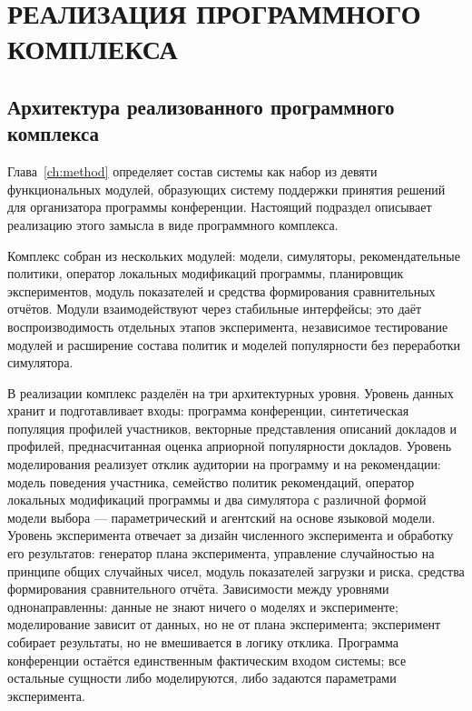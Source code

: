 \chapter{РЕАЛИЗАЦИЯ ПРОГРАММНОГО КОМПЛЕКСА}
\label{ch:implementation}
\sloppy


\section{Архитектура реализованного программного комплекса}
\label{sec:3-1}

Глава~\ref{ch:method} определяет состав системы как набор из девяти функциональных модулей, образующих систему поддержки принятия решений для организатора программы конференции. Настоящий подраздел описывает реализацию этого замысла в виде программного комплекса.

Комплекс собран из нескольких модулей: модели, симуляторы, рекомендательные политики, оператор локальных модификаций программы, планировщик экспериментов, модуль показателей и средства формирования сравнительных отчётов. Модули взаимодействуют через стабильные интерфейсы; это даёт воспроизводимость отдельных этапов эксперимента, независимое тестирование модулей и расширение состава политик и моделей популярности без переработки симулятора.

В реализации комплекс разделён на три архитектурных уровня. Уровень данных хранит и подготавливает входы: программа конференции, синтетическая популяция профилей участников, векторные представления описаний докладов и профилей, преднасчитанная оценка априорной популярности докладов. Уровень моделирования реализует отклик аудитории на программу и на рекомендации: модель поведения участника, семейство политик рекомендаций, оператор локальных модификаций программы и два симулятора с различной формой модели выбора --- параметрический и агентский на основе языковой модели. Уровень эксперимента отвечает за дизайн численного эксперимента и обработку его результатов: генератор плана эксперимента, управление случайностью на принципе общих случайных чисел, модуль показателей загрузки и риска, средства формирования сравнительного отчёта. Зависимости между уровнями однонаправленны: данные не знают ничего о моделях и эксперименте; моделирование зависит от данных, но не от плана эксперимента; эксперимент собирает результаты, но не вмешивается в логику отклика. Программа конференции остаётся единственным фактическим входом системы; все остальные сущности либо моделируются, либо задаются параметрами эксперимента.

